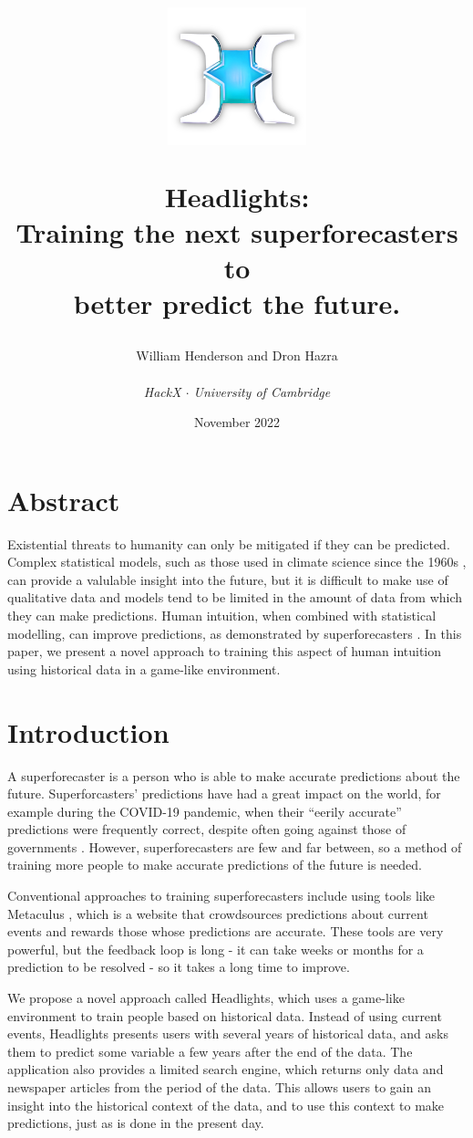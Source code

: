 \documentclass{article}
\title{
\begin{center}
\includegraphics[width=0.3\textwidth]{logo.png}
\end{center}  

\textbf{Headlights}: \\
Training the next superforecasters to \\
better predict the future.}
\author{William Henderson and Dron Hazra \\
\\
\textit{HackX $\cdot$ University of Cambridge}
}
\date{November 2022}
\begin{document}
\maketitle

\section{Abstract}

Existential threats to humanity can only be mitigated if they can be predicted. Complex statistical models, such as those used in climate science since the 1960s \cite{noaa}, can provide a valulable insight into the future, but it is difficult to make use of qualitative data and models tend to be limited in the amount of data from which they can make predictions. Human intuition, when combined with statistical modelling, can improve predictions, as demonstrated by superforecasters \cite{superforecasters}. In this paper, we present a novel approach to training this aspect of human intuition using historical data in a game-like environment.

\section{Introduction}

A superforecaster is a person who is able to make accurate predictions about the future. Superforcasters' predictions have had a great impact on the world, for example during the COVID-19 pandemic, when their ``eerily accurate'' predictions were frequently correct, despite often going against those of governments \cite{covid19}. However, superforecasters are few and far between, so a method of training more people to make accurate predictions of the future is needed.

Conventional approaches to training superforecasters include using tools like Metaculus \cite{metaculus}, which is a website that crowdsources predictions about current events and rewards those whose predictions are accurate. These tools are very powerful, but the feedback loop is long - it can take weeks or months for a prediction to be resolved - so it takes a long time to improve.

We propose a novel approach called Headlights, which uses a game-like environment to train people based on historical data. Instead of using current events, Headlights presents users with several years of historical data, and asks them to predict some variable a few years after the end of the data. The application also provides a limited search engine, which returns only data and newspaper articles from the period of the data. This allows users to gain an insight into the historical context of the data, and to use this context to make predictions, just as is done in the present day.
\end{document}
